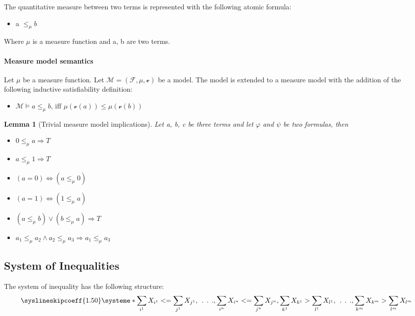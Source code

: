 \documentclass{article}
\newtheorem{lemma}[theorem]{Lemma}
\begin{document}
	The quantitative measure between two terms is represented with the following atomic formula:
	\begin{itemize} 
		\item a $\le_\mu b$
	\end{itemize}
	Where $\mu$ is a measure function and a, b are two terms.
	
	\paragraph{Measure model semantics} Let $\mu$ be a measure function.
	Let  $\mathcal{M} = (\mathcal{F}, \mu, \mathscr{v})$ be a model. 
	The model is extended to a measure model with the addition of the following inductive satisfiability definition: 
	\begin{itemize}
		\item $\mathcal{M} \models a \leq_\mu b \text{, iff } \mu(\mathscr{v}(a)) \le \mu(\mathscr{v}(b))$
	\end{itemize}

\begin{lemma}[Trivial measure model implications]
Let a, b, c be three terms and let $\varphi$ and $\psi$ be two formulas, then
	\begin{itemize}
		\item $0 \le_\mu a \Longrightarrow T$
		\item $a \le_\mu 1 \Longrightarrow T$
		\item $(a = 0) \iff (a \le_\mu 0)$
		\item $(a = 1) \iff (1 \le_\mu a)$
		\item $(a \le_\mu b) \lor (b \le_\mu a) \Longrightarrow T$
		\item $a_1 \le_\mu a_2 \land a_2 \le_\mu a_3 \Longrightarrow a_1 \le_\mu a_3$
	\end{itemize}
\end{lemma}

	\newpage
	\subsection{System of Inequalities} 
		The system of inequality has the following structure:
		\[
			\syslineskipcoeff{1.50}
			\systeme*{\sum_{i^1} X_{i^1} <= \sum_{j^1} X_{j^1},
				\:\:.\:\:.\:\:.,
				\sum_{i^n} X_{i^n} <= \sum_{j^n} X_{j^n}, 
				\sum_{k^1} X_{k^1} > \sum_{l^1} X_{l^1},
				\:\:.\:\:.\:\:.,
				\sum_{k^m} X_{k^m} > \sum_{l^m} X_{l^m}
				}
		\]

		\leavevmode\newline
\end{document}
